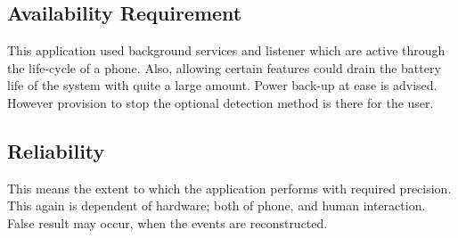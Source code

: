 \subsection{Availability Requirement}
\label{subsec:subsec02}

This application used background services and listener which are active through the life-cycle of a phone. 
Also, allowing certain features could drain the battery life of the system with quite a large amount. Power back-up at ease is advised. However provision to stop the optional detection method is there for the user.

\subsection{Reliability}
\label{subsec:subsec03}
This means the extent to which the application performs with required precision. This again is dependent of hardware; both of phone, and human interaction. \\
False result may occur, when the events are reconstructed.